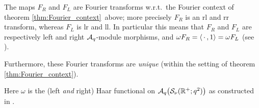 \begin{prop} \label{prop:Eq2:Fourier_transforms}
The maps $F_R$ and $F_L$ are Fourier transforms w.r.t.\ the
Fourier context of theorem \ref{thm:Fourier_context}\
above; more precisely $F_R$ is an {\sc rl} and {\sc rr} transform,
whereas $F_L$ is {\sc lr} and {\sc ll}.
In particular this means that $F_R$ and $F_L$ are respectively left and right
${\mathcal A}_q$-module morphisms, and $\omega F_R = \langle \,\cdot\,,1 \rangle = \omega F_L$
(see \mbox{\cite[2.2.2]{Jeroen:QE2:haar}}).

Furthermore, these Fourier transforms are {\em unique\/}
(within the setting of theorem \ref{thm:Fourier_context}).

\rm  Here $\omega$ is the (left {\em and\/} right) Haar functional on
${\mathcal A}_q\!\left({\mathcal S}_\nu(\mathbb{R}^+;q^2)\right)$ as constructed in
\cite{Jeroen:QE2:haar}\@.
\end{prop}
